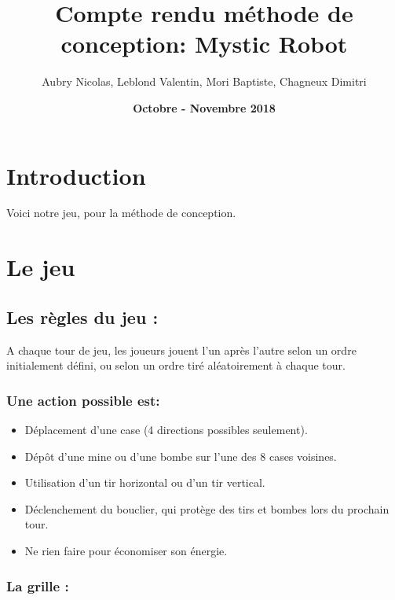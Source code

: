 \documentclass{article}
\title{ \bf Compte rendu méthode de conception:  Mystic Robot}
\author{ Aubry Nicolas, Leblond Valentin, Mori Baptiste, Chagneux Dimitri}
\date{ \bf Octobre - Novembre 2018}
\begin{document}
\maketitle
\tableofcontents

\vspace{5\baselineskip}

\section{Introduction}
Voici notre jeu, pour la méthode de conception.

\section{Le jeu }

\subsection{Les règles du jeu : }

A chaque tour de jeu, les joueurs jouent l'un après l'autre selon un ordre initialement défini, ou selon
un ordre tiré aléatoirement à chaque tour.

\vspace{1\baselineskip}

\subsubsection{Une action possible est:}

\vspace{1\baselineskip}

\begin{itemize}
    \item  Déplacement d'une case (4 directions possibles seulement).
    \item  Dépôt d'une mine ou d'une bombe sur l'une des 8 cases voisines.
    \item  Utilisation d'un tir horizontal ou d'un tir vertical.
    \item  Déclenchement du bouclier, qui protège des tirs et bombes lors du prochain tour.
    \item  Ne rien faire pour économiser son énergie.
\end{itemize}

\vspace{1\baselineskip}

\subsubsection{La grille :}
\end{document}
